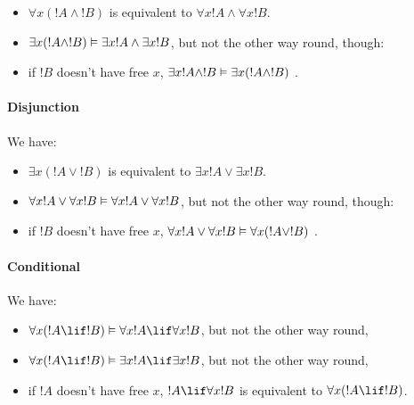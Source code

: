 \documentclass[../../../include/open-logic-section]{subfiles}
\begin{document}
\begin{itemize}
	\item $\forall x (!A \land !B)$ is equivalent to $\forall x !A \land \forall x !B$.
	\item $\exists x (!A \land !B) \Entails \exists x !A \land \exists x !B$, but not the other way round, though:
	\item if $!B$ doesn't have free $x$, $\exists x !A \land !B \Entails \exists x (!A \land !B)$ .
\end{itemize}

\paragraph{Disjunction} We have:

\begin{itemize}
	\item $\exists x (!A \lor !B)$ is equivalent to $\exists x !A \lor \exists x !B$.
	\item $\forall x !A \lor \forall x !B \Entails \forall x !A \lor \forall x !B$, but not the other way round, though:
	\item if $!B$ doesn't have free $x$, $\forall x !A \lor \forall x !B \Entails \forall x (!A \lor !B)$ .
\end{itemize}

\paragraph{Conditional} We have:

\begin{itemize}
	\item $\forall x (!A \lif !B) \Entails \forall x !A \lif \forall x !B$, but not the other way round,
	\item $\forall x (!A \lif !B) \Entails \exists x !A \lif \exists x !B$, but not the other way round,
	\item if $!A$ doesn't have free $x$, $!A \lif \forall x !B$ is equivalent to $\forall x (!A \lif !B)$.
\end{itemize}
\end{document}
